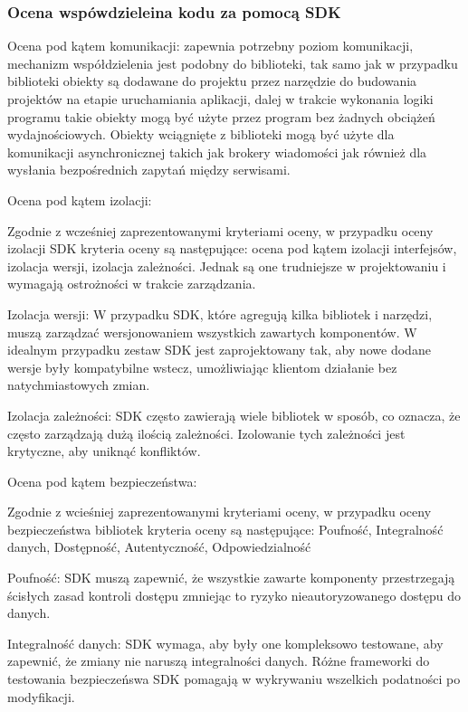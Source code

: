 \documentclass[runningheads,12pt]{llncs}
\begin{document}
\subsubsection{Ocena wspówdzieleina kodu za pomocą SDK}

Ocena pod kątem komunikacji: zapewnia potrzebny poziom komunikacji, mechanizm współdzielenia jest podobny do biblioteki, tak samo jak w przypadku biblioteki obiekty są dodawane do projektu przez narzędzie do budowania projektów na etapie uruchamiania aplikacji, dalej w trakcie wykonania logiki programu takie obiekty mogą być użyte przez program bez żadnych obciążeń wydajnościowych. Obiekty wciągnięte z biblioteki mogą być użyte dla komunikacji asynchronicznej takich jak brokery wiadomości jak również dla wysłania bezpośrednich zapytań między serwisami.

Ocena pod kątem izolacji: 

Zgodnie z wcześniej zaprezentowanymi kryteriami oceny, w przypadku oceny izolacji SDK kryteria oceny są następujące: ocena pod kątem izolacji interfejsów, izolacja wersji, izolacja zależności. Jednak są one trudniejsze w projektowaniu i wymagają ostrożności w trakcie zarządzania. ~\cite[p. 75]{Essential}

Izolacja wersji: W przypadku SDK, które agregują kilka bibliotek i narzędzi, muszą zarządzać wersjonowaniem wszystkich zawartych komponentów. W idealnym przypadku zestaw SDK jest zaprojektowany tak, aby nowe dodane wersje były kompatybilne wstecz, umożliwiając klientom działanie bez natychmiastowych zmian.

Izolacja zależności: SDK często zawierają wiele bibliotek w sposób, co oznacza, że często zarządzają dużą ilością zależności. Izolowanie tych zależności jest krytyczne, aby uniknąć konfliktów. ~\cite[p. 218]{martin2008clean}

Ocena pod kątem bezpieczeństwa: 

Zgodnie z wcieśniej zaprezentowanymi kryteriami oceny, w przypadku oceny bezpieczeństwa bibliotek kryteria oceny są następujące: Poufność, Integralność danych, Dostępność, Autentyczność, Odpowiedzialność

Poufność: SDK muszą zapewnić, że wszystkie zawarte komponenty przestrzegają ścisłych zasad kontroli dostępu zmniejąc to ryzyko nieautoryzowanego dostępu do danych.  ~\cite[para 4]{azure2020}

Integralność danych: SDK wymaga, aby były one kompleksowo testowane, aby zapewnić, że zmiany nie naruszą integralności danych. Różne frameworki do testowania bezpieczeńswa SDK pomagają w wykrywaniu wszelkich podatności po modyfikacji.  ~\cite[para 5]{azure2020}
\end{document}

